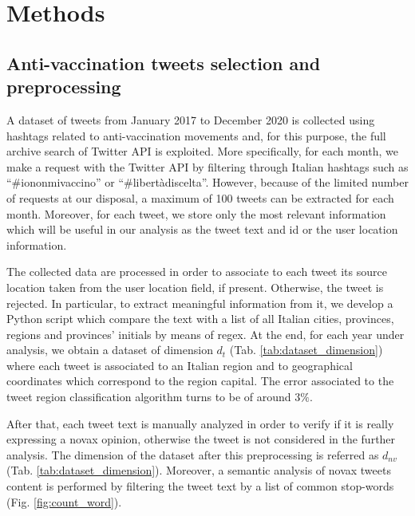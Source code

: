 \documentclass[prb,twocolumn,9pt]{revtex4-1}
\begin{document}
\section{Methods}
\label{sec:methods}

\subsection{Anti-vaccination tweets selection and preprocessing}
\label{sec:Anti-vaccination tweets selection and preprocessing}

A dataset of tweets from January 2017 to December 2020 is collected using hashtags related to anti-vaccination movements and, for this purpose, the full archive search of Twitter API is exploited. 
More specifically, for each month, we make a request with the Twitter API by filtering through Italian hashtags such as “$\#$iononmivaccino” or “$\#$libertàdiscelta”. However, because of the limited number of requests at our disposal, a maximum of 100 tweets can be extracted for each month.
Moreover, for each tweet, we store only the most relevant information which will be useful in our analysis as the tweet text and id or the user location information.

The collected data are processed in order to associate to each tweet its source location taken from the user location field, if present. Otherwise, the tweet is rejected. In particular, to extract meaningful information from it, we develop a Python script which compare the text with a list of all Italian cities, provinces, regions and provinces' initials by means of regex. At the end, for each year under analysis, we obtain a dataset of dimension $d_t$ (Tab. \ref{tab:dataset_dimension}) where each tweet is associated to an Italian region and to geographical coordinates which correspond to the region capital. The error associated to the tweet region classification algorithm turns to be of around $3\%$. 

After that, each tweet text is manually analyzed in order to verify if it is really expressing a novax opinion, otherwise the tweet is not considered in the further analysis. The dimension of the dataset after this preprocessing is referred as $d_{nv}$ (Tab. \ref{tab:dataset_dimension}). Moreover, a semantic analysis of novax tweets content is performed by filtering the tweet text by a list of common stop-words (Fig. \ref{fig:count_word}).
\end{document}
